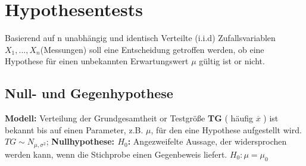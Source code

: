 \section{Hypothesentests}
Basierend auf n unabhängig und identisch Verteilte (i.i.d) Zufallsvariablen $ X_{1}, ..., X_{n} $(Messungen) soll eine Entscheidung getroffen werden, ob eine Hypothese für einen unbekannten Erwartungswert $ \mu $ gültig ist or nicht.
\subsection{Null- und Gegenhypothese}
\textbf{Modell:} Verteilung der Grundgesamtheit or Testgröße \textbf{TG} ( häufig $\overline{x}$ ) ist bekannt bis auf einen Parameter, z.B. $ \mu $, für den eine Hypothese aufgestellt wird.
$ TG \sim  N_{\mu, \sigma^2}$; 
\textbf{Nullhypothese: $ H_{0}$:} Angezweifelte Aussage, der widersprochen werden kann, wenn die Stichprobe einen Gegenbeweis liefert. $ H_{0}: \mu = \mu_{0}$ 